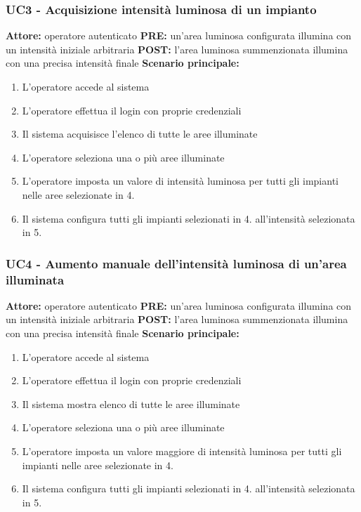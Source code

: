 \documentclass[a4paper, 12pt]{article}
\begin{document}
\subsubsection{UC3 - Acquisizione intensità luminosa di un impianto}
\textbf{Attore:} operatore autenticato\newline
\textbf{PRE:} un'area luminosa configurata illumina con un intensità iniziale arbitraria\newline
\textbf{POST:} l'area luminosa summenzionata illumina con una precisa intensità finale\newline
\textbf{Scenario principale:}
\begin{enumerate}
    \item L'operatore accede al sistema
    \item L'operatore effettua il login con proprie credenziali
    \item Il sistema acquisisce l'elenco di tutte le aree illuminate
    \item L'operatore seleziona una o più aree illuminate
    \item L'operatore imposta un valore di intensità luminosa per tutti gli impianti nelle aree selezionate in 4.
    \item Il sistema configura tutti gli impianti selezionati in 4. all'intensità selezionata in 5.
\end{enumerate}

\subsubsection{UC4 - Aumento manuale dell'intensità luminosa di un'area illuminata}
\textbf{Attore:} operatore autenticato\newline
\textbf{PRE:} un'area luminosa configurata illumina con un intensità iniziale arbitraria\newline
\textbf{POST:} l'area luminosa summenzionata illumina con una precisa intensità finale\newline
\textbf{Scenario principale:}
\begin{enumerate}
    \item L'operatore accede al sistema
    \item L'operatore effettua il login con proprie credenziali
    \item Il sistema mostra elenco di tutte le aree illuminate
    \item L'operatore seleziona una o più aree illuminate
    \item L'operatore imposta un valore maggiore di intensità luminosa per tutti gli impianti nelle aree selezionate in 4.
    \item Il sistema configura tutti gli impianti selezionati in 4. all'intensità selezionata in 5.
\end{enumerate}
\end{document}

